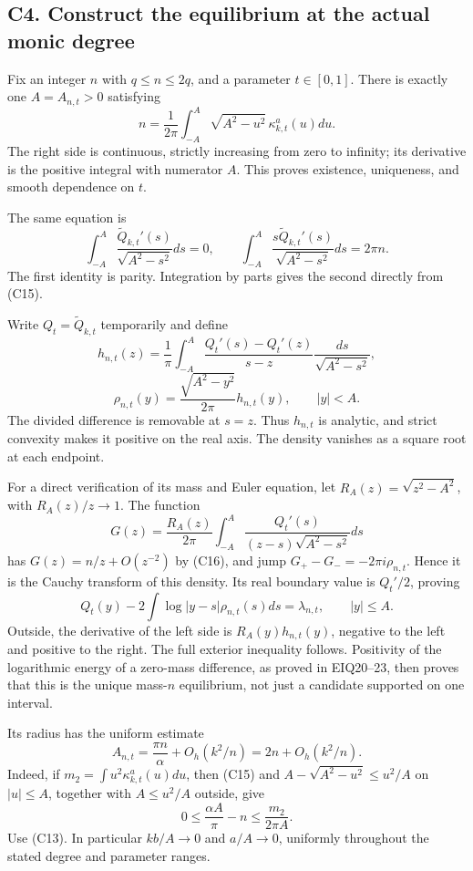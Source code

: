 \subsection{C4. Construct the equilibrium at the actual monic
degree}\label{sa:c4.-construct-the-equilibrium-at-the-actual-monic-degree}

Fix an integer \(n\) with \(q\le n\le2q\), and a parameter
\(t\in[0,1]\). There is exactly one \(A=A_{n,t}>0\) satisfying \[
\boxed{n=\frac1{2\pi}\int_{-A}^{A}
\sqrt{A^2-u^2}\,\kappa^a_{k,t}(u)du.}\tag{C15}
\] The right side is continuous, strictly increasing from zero to
infinity; its derivative is the positive integral with numerator \(A\).
This proves existence, uniqueness, and smooth dependence on \(t\).

The same equation is \[
\int_{-A}^A\frac{\widetilde Q_{k,t}'(s)}{\sqrt{A^2-s^2}}ds=0,
\qquad
\int_{-A}^A\frac{s\widetilde Q_{k,t}'(s)}{\sqrt{A^2-s^2}}ds=2\pi n.
\tag{C16}
\] The first identity is parity. Integration by parts gives the second
directly from (C15).

Write \(Q_t=\widetilde Q_{k,t}\) temporarily and define \[
h_{n,t}(z)=\frac1\pi\int_{-A}^A
\frac{Q_t'(s)-Q_t'(z)}{s-z}\frac{ds}{\sqrt{A^2-s^2}},
\] \[
\rho_{n,t}(y)=\frac{\sqrt{A^2-y^2}}{2\pi}h_{n,t}(y),
\qquad |y|<A.
\tag{C17}
\] The divided difference is removable at \(s=z\). Thus \(h_{n,t}\) is
analytic, and strict convexity makes it positive on the real axis. The
density vanishes as a square root at each endpoint.

For a direct verification of its mass and Euler equation, let
\(R_A(z)=\sqrt{z^2-A^2}\), with \(R_A(z)/z\to1\). The function \[
G(z)=\frac{R_A(z)}{2\pi}\int_{-A}^A
\frac{Q_t'(s)}{(z-s)\sqrt{A^2-s^2}}ds
\] has \(G(z)=n/z+O(z^{-2})\) by (C16), and jump
\(G_+-G_-=-2\pi i\rho_{n,t}\). Hence it is the Cauchy transform of this
density. Its real boundary value is \(Q_t'/2\), proving \[
\boxed{Q_t(y)-2\int\log|y-s|\rho_{n,t}(s)ds
=\lambda_{n,t},\qquad |y|\le A.}\tag{C18}
\] Outside, the derivative of the left side is \(R_A(y)h_{n,t}(y)\),
negative to the left and positive to the right. The full exterior
inequality follows. Positivity of the logarithmic energy of a zero-mass
difference, as proved in EIQ20--23, then proves that this is the unique
mass-\(n\) equilibrium, not just a candidate supported on one interval.

Its radius has the uniform estimate \[
\boxed{A_{n,t}=\frac{\pi n}{\alpha}+O_h(k^2/n)=2n+O_h(k^2/n).}\tag{C19}
\] Indeed, if \(m_2=\int u^2\kappa^a_{k,t}(u)du\), then (C15) and
\(A-\sqrt{A^2-u^2}\le u^2/A\) on \(|u|\le A\), together with
\(A\le u^2/A\) outside, give \[
0\le\frac{\alpha A}{\pi}-n\le\frac{m_2}{2\pi A}.
\] Use (C13). In particular \(kb/A\to0\) and \(a/A\to0\), uniformly
throughout the stated degree and parameter ranges.

